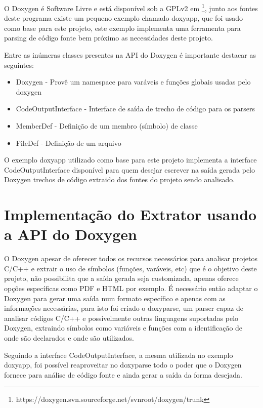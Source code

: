 O Doxygen é Software Livre e está disponível sob a GPLv2 em
\footnote{https://doxygen.svn.sourceforge.net/svnroot/doxygen/trunk}, junto aos
fontes deste programa existe um pequeno exemplo chamado doxyapp, que foi usado
como base para este projeto, este exemplo implementa uma ferramenta para parsing de
código fonte bem próximo as necessidades deste projeto.

Entre as inúmeras classes presentes na API do Doxygen é importante destacar as
seguintes:

\begin{itemize}
\item Doxygen - Provê um namespace para varáveis e funções globais usadas pelo
doxygen
\item CodeOutputInterface - Interface de saída de trecho de código para os
parsers
\item MemberDef - Definição de um membro (símbolo) de classe
\item FileDef - Definição de um arquivo
\end{itemize}

O exemplo doxyapp utilizado como base para este projeto implementa a interface CodeOutputInterface disponível para
quem desejar escrever na saída gerada pelo Doxygen trechos de código extraido
dos fontes do projeto sendo analisado.

\section{Implementação do Extrator usando a API do Doxygen}

O Doxygen apesar de oferecer todos os recursos necessários para
analisar projetos C/C++ e extrair o uso de símbolos (funções, varáveis, etc)
que é o objetivo deste projeto, não possibilita que a saída gerada seja
customizada, apenas oferece opções específicas como PDF e HTML por exemplo. É
necessário então adaptar o Doxygen para gerar uma saída num formato
específico e apenas com as informações necessárias, para isto foi criado o
doxyparse, um parser capaz de analisar códigos C/C++ e possivelmente outras
linguagens suportadas pelo Doxygen, extraindo símbolos como variáveis e funções
com a identificação de onde são declarados e onde são utilizados.

Seguindo a interface CodeOutputInterface, a mesma utilizada no exemplo doxyapp,
foi possível reaproveitar no doxyparse todo o poder que o Doxygen fornece para
análise de código fonte e ainda gerar a saída da forma desejada.

